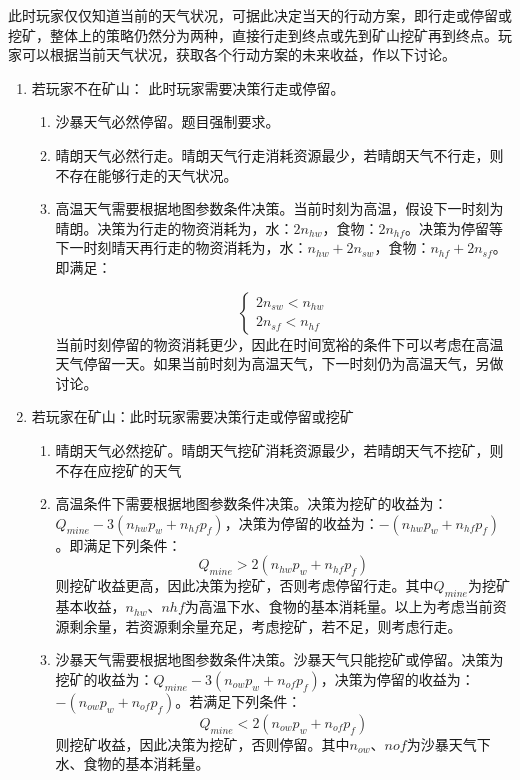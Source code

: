 \documentclass[withoutpreface,bwprint]{cumcmthesis} %
\begin{document}
此时玩家仅仅知道当前的天气状况，可据此决定当天的行动方案，即行走或停留或挖矿，整体上的策略仍然分为两种，直接行走到终点或先到矿山挖矿再到终点。玩家可以根据当前天气状况，获取各个行动方案的未来收益，作以下讨论。
\begin{enumerate}
    \item 若玩家不在矿山：
    此时玩家需要决策行走或停留。
    \begin{enumerate}
        \item 沙暴天气必然停留。题目强制要求。
        \item 晴朗天气必然行走。晴朗天气行走消耗资源最少，若晴朗天气不行走，则不存在能够行走的天气状况。
        \item 高温天气需要根据地图参数条件决策。当前时刻为高温，假设下一时刻为晴朗。决策为行走的物资消耗为，水：$2n_{hw}$，食物：$2n_{hf}$。决策为停留等下一时刻晴天再行走的物资消耗为，水：$n_{hw} + 2n_{sw}$，食物：$n_{hf} + 2n_{sf}$。即满足：

        \begin{equation}
            \left\{
                \begin{array}{lr}
                    2n_{sw} < n_{hw}  \\
                    2n_{sf} < n_{hf}
                \end{array}
            \right.
            \label{equa:1}
        \end{equation}
        当前时刻停留的物资消耗更少，因此在时间宽裕的条件下可以考虑在高温天气停留一天。如果当前时刻为高温天气，下一时刻仍为高温天气，另做讨论。
    \end{enumerate}
    \item 若玩家在矿山：此时玩家需要决策行走或停留或挖矿
    \begin{enumerate}
        \item 晴朗天气必然挖矿。晴朗天气挖矿消耗资源最少，若晴朗天气不挖矿，则不存在应挖矿的天气
        \item 高温条件下需要根据地图参数条件决策。决策为挖矿的收益为：$Q_{mine} - 3(n_{hw}p_w + n_{hf}p_f)$，决策为停留的收益为：$-(n_{hw}p_w + n_{hf}p_f)$。即满足下列条件：
        \begin{equation}
            Q_{mine} > 2(n_{hw}p_w + n_{hf}p_f)
            \label{equa:2}
        \end{equation}
        则挖矿收益更高，因此决策为挖矿，否则考虑停留行走。其中$Q_{mine}$为挖矿基本收益，$n_{hw}$、$n{hf}$为高温下水、食物的基本消耗量。以上为考虑当前资源剩余量，若资源剩余量充足，考虑挖矿，若不足，则考虑行走。
        \item 沙暴天气需要根据地图参数条件决策。沙暴天气只能挖矿或停留。决策为挖矿的收益为：$Q_{mine} - 3(n_{ow}p_w + n_{of}p_f)$，决策为停留的收益为：$-(n_{ow}p_w + n_{of}p_f)$。若满足下列条件：
        \begin{equation}
            Q_{mine} < 2(n_{ow}p_w + n_{of}p_f)
            \label{equa:3}
        \end{equation}
        则挖矿收益，因此决策为挖矿，否则停留。其中$n_{ow}$、$n{of}$为沙暴天气下水、食物的基本消耗量。
    \end{enumerate}
\end{enumerate}
\end{document}
